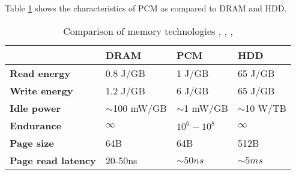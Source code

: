 Table \ref{tab:tab_pcm_char} shows the characteristics of PCM as compared to DRAM and HDD.
                                                                                                          
\begin{table}[!h]                                                                                       
\centering                                                                                              
                                                                                                          
                                                                                                          
\caption{Comparison of memory technologies \cite{qureshi}, \cite{lee}, \cite{numonyx}, \cite{chen}}
  \label{tab:tab_pcm_char}                                                                                
  \begin{small}                                                                                           
  \begin{tabular}{p{2.3cm}p{1.5cm}p{1.7cm}p{1.7cm}}
  \toprule                                                                                                
  
    &  \textbf{DRAM} & \textbf{PCM} &  \textbf{HDD} \\
  \midrule                                                                                                
  
  \textbf{Read energy} & 0.8 J/GB & 1 J/GB  & 65 J/GB \\ 
  
  \textbf{Write energy} & 1.2 J/GB & 6 J/GB  & 65 J/GB \\   
  
  \textbf{Idle power} & $\sim$100 mW/GB & $\sim$1 mW/GB  & $\sim$10 W/TB \\ 
  
  \textbf{Endurance} & $\infty$ & $10^6 - 10^8$  & $\infty$ \\                                            
  
  \textbf{Page size} & 64B & 64B  & 512B \\                                                               
  
  \textbf{Page read latency}& 20-50ns & $\sim 50ns$  & $\sim 5ms$ \\  
  

\end{tabular}
\end{small}
\end{table}
